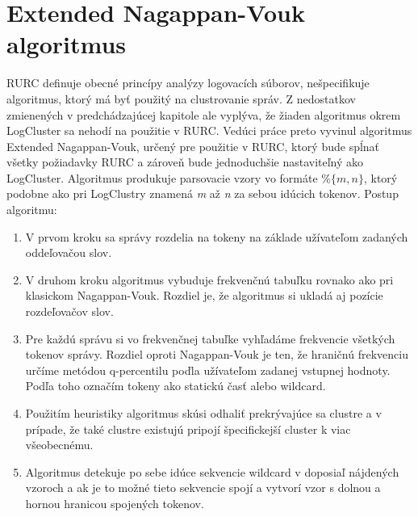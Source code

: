 \section{Extended Nagappan-Vouk algoritmus}
RURC definuje obecné princípy analýzy logovacích súborov, nešpecifikuje algoritmus, ktorý má byť použitý na clustrovanie správ.
Z nedostatkov zmienených v predchádzajúcej kapitole ale vyplýva, že žiaden algoritmus okrem LogCluster sa nehodí na použitie v RURC.
Vedúci práce preto vyvinul algoritmus Extended Nagappan-Vouk, určený pre použitie v RURC, ktorý bude spĺnať všetky požiadavky RURC a zároveň bude jednoduchšie nastaviteľný ako LogCluster. Algoritmus produkuje parsovacie vzory vo formáte $\%\{m,n\}$, ktorý podobne ako pri LogClustry znamená \emph{m} až \emph{n} za sebou idúcich tokenov. Postup algoritmu: 

\begin{enumerate}
 \item V prvom kroku sa správy rozdelia na tokeny na základe užívateľom zadaných oddeľovačou slov.
 \item V druhom kroku algoritmus vybuduje frekvenčnú tabuľku rovnako ako pri klasickom Nagappan-Vouk. Rozdiel je, že algoritmus si ukladá aj pozície rozdeľovačov slov.
 \item Pre každú správu si vo frekvenčnej tabuľke vyhľadáme frekvencie všetkých tokenov správy. Rozdiel oproti Nagappan-Vouk je ten, že hraničnú frekvenciu určíme metódou q-percentilu poďla užívateľom zadanej vstupnej hodnoty. Podľa toho označím tokeny ako statickú časť alebo wildcard.
 \item Použitím heuristiky algoritmus skúsi odhaliť prekrývajúce sa clustre a v prípade, že také clustre existujú pripojí špecifickejší cluster k viac všeobecnému.
 \item Algoritmus detekuje po sebe idúce sekvencie wildcard v doposiaľ nájdených vzoroch a ak je to možné tieto sekvencie spojí a vytvorí
 vzor s dolnou a hornou hranicou spojených tokenov.
\end{enumerate}



